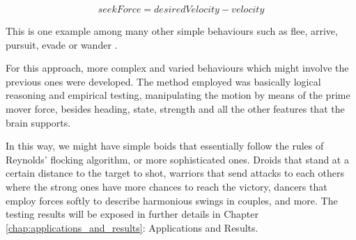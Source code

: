 \begin{equation}
	seekForce=desiredVelocity-velocity 
\end{equation}

This is one example among many other simple behaviours such as flee, arrive, pursuit, evade or wander \citep{buckland}. 

For this approach, more complex and varied behaviours which might involve the previous ones were developed. The method employed was basically logical reasoning and empirical testing, manipulating the motion by means of the prime mover force, besides heading, state, strength and all the other features that the brain supports.

In this way, we might have simple boids that essentially follow the rules of Reynolds' flocking algorithm, or more sophisticated ones. Droids that stand at a certain distance to the target to shot, warriors that send attacks to each others where the strong ones have more chances to reach the victory, dancers that employ forces softly to describe harmonious swings in couples, and more. The testing results will be exposed in further details in Chapter \ref{chap:applications_and_results}: Applications and Results.

\ifx\isEmbedded\undefined


\pagebreak

\fi